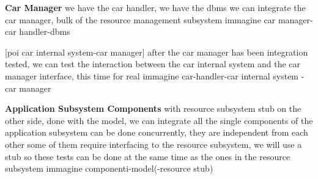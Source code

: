 \documentclass[english]{article}
\begin{document}
\textbf{Car Manager}
we have the car handler, we have the dbms
we can integrate the car manager, bulk of the resource management subsystem
immagine car manager-car handler-dbms
\begin{figure}[H]
	\centering
\end{figure}

[poi car internal system-car manager]
after the car manager has been integration tested, we can test the interaction between the car internal system and the car manager interface, this time for real
immagine car-handler-car internal system -car manager
\begin{figure}[H]
	\centering
\end{figure}

\textbf{Application Subsystem Components}
with resource subsystem stub
on the other side, done with the model, we can integrate all the single components of the application subsystem
can be done concurrently, they are independent from each other
some of them require interfacing to the resource subsystem, we will use a stub so these tests can be done at the same time as the ones in the resource subsystem
immagine componenti-model(-resource stub)
\end{document}
